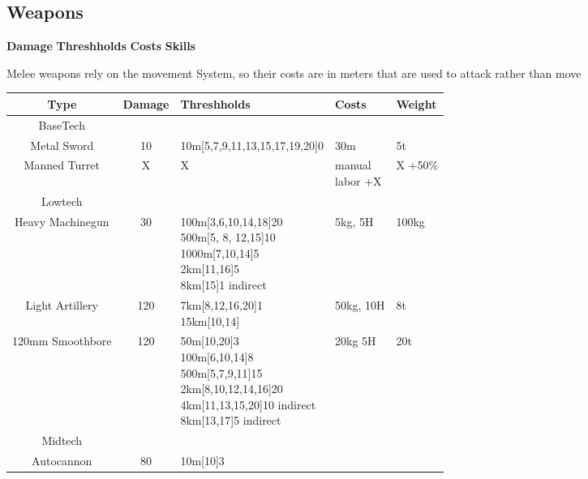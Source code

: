 \subsection{Weapons}\label{subsec:weapons}
\textbf{Damage}
\textbf{Threshholds}
\textbf{Costs}
\textbf{Skills}

Melee weapons rely on the movement System, so their costs are in meters that are used to attack rather than move\par
\begin{tabular}{c|clll}
    Type & Damage & Threshholds & Costs & Weight\\
    \hline \hline BaseTech&&&&\\
    \hline Metal Sword & 10 & 10m[5,7,9,11,13,15,17,19,20]0 & 30m & 5t \\
    \hline Manned Turret & X & X & \makecell[l]{manual \\labor +X} &  X +50\% \\
    \hline \hline Lowtech &&&&\\
    \hline Heavy Machinegun & 30 & \makecell[l]{100m[3,6,10,14,18]20\\
                                        500m[5, 8, 12,15]10\\
                                        1000m[7,10,14]5\\
                                        2km[11,16]5\\
                                        8km[15]1 indirect}
                                            & 5kg, 5H & 100kg \\
    \hline Light Artillery & 120 & \makecell[l]{7km[8,12,16,20]1 \\
                                        15km[10,14]}& 50kg, 10H & 8t  \\
    \hline 120mm Smoothbore & 120 & \makecell[l]{50m[10,20]3\\
                                        100m[6,10,14]8\\
                                        500m[5,7,9,11]15\\
                                        2km[8,10,12,14,16]20\\
                                        4km[11,13,15,20]10 indirect\\
                                        8km[13,17]5 indirect}
                                            & 20kg 5H & 20t \\
    \hline\hline Midtech &&&&\\
    \hline Autocannon & 80 & \makecell[l]{10m[10]3\\
}
\end{tabular}
